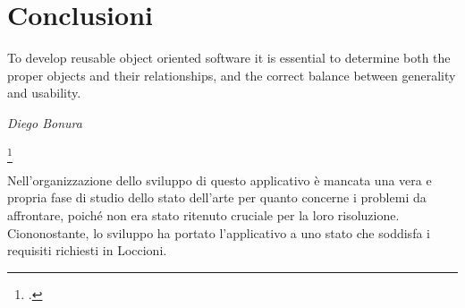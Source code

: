 






\chapter{Conclusioni}
\label{chap:conclusione}
\setlength{\epigraphwidth}{0.6\textwidth}
\epigraph{To develop reusable object oriented software it is essential to
determine both the proper objects and their relationships,
and the correct balance between generality and usability.}{\textit{Diego Bonura}\footnotemark }
\footcitetext{DBLP:conf/seke/BonuraCM02}

Nell'organizzazione dello sviluppo di questo applicativo è mancata una vera e propria fase di studio dello stato dell'arte per quanto concerne i problemi da affrontare, poiché non era stato ritenuto cruciale per la loro risoluzione.
Ciononostante, lo sviluppo ha portato l'applicativo a uno stato che soddisfa i requisiti richiesti in Loccioni. 

